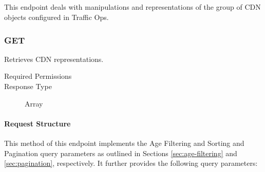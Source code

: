 %
%

\subsection{}
This endpoint deals with manipulations and representations of the group of CDN
objects configured in Traffic Ops.

\subsubsection{GET}
Retrieves CDN representations.
\begin{description}
	\item[Required Permissions] 
	\item[Response Type] Array
\end{description}

\paragraph{Request Structure}
This method of this endpoint implements the Age Filtering and Sorting and
Pagination query parameters as outlined in Sections \ref{sec:age-filtering} and
\ref{sec:pagination}, respectively. It further provides the following query
parameters:

